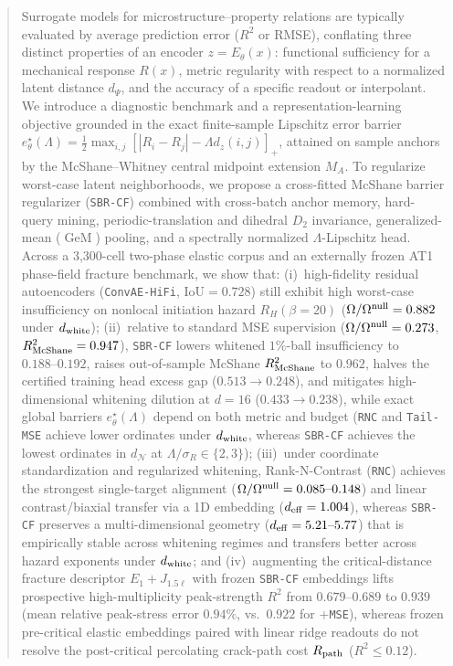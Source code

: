 \documentclass[preprint,11pt,a4paper]{elsarticle}
\newcommand{\GeM}{\operatorname{GeM}}
\begin{document}
\begin{frontmatter}
\begin{abstract}
Surrogate models for microstructure--property relations are typically evaluated by average prediction error ($R^2$ or RMSE), conflating three distinct properties of an encoder $z=E_\theta(x)$: functional sufficiency for a mechanical response $R(x)$, metric regularity with respect to a normalized latent distance $d_\Psi$, and the accuracy of a specific readout or interpolant. We introduce a diagnostic benchmark and a representation-learning objective grounded in the exact finite-sample Lipschitz error barrier $e^\star_\theta(\Lambda)=\frac12\max_{i,j}[|R_i-R_j|-\Lambda d_z(i,j)]_+$, attained on sample anchors by the McShane--Whitney central midpoint extension $M_A$. To regularize worst-case latent neighborhoods, we propose a cross-fitted McShane barrier regularizer (\texttt{SBR-CF}) combined with cross-batch anchor memory, hard-query mining, periodic-translation and dihedral $D_2$ invariance, generalized-mean ($\GeM$) pooling, and a spectrally normalized $\Lambda$-Lipschitz head. Across a 3,300-cell two-phase elastic corpus and an externally frozen AT1 phase-field fracture benchmark, we show that: (i)~high-fidelity residual autoencoders (\texttt{ConvAE-HiFi}, $\text{IoU}=0.728$) still exhibit high worst-case insufficiency on nonlocal initiation hazard $R_H(\beta=20)$ ($\Omega/\Omega^{\rm null}=0.882$ under $d_{\rm white}$); (ii)~relative to standard MSE supervision ($\Omega/\Omega^{\rm null}=0.273$, $R^2_{\rm McShane}=0.947$), \texttt{SBR-CF} lowers whitened $1\%$-ball insufficiency to $0.188\text{--}0.192$, raises out-of-sample McShane $R^2_{\rm McShane}$ to $0.962$, halves the certified training head excess gap ($0.513\to 0.248$), and mitigates high-dimensional whitening dilution at $d=16$ ($0.433\to 0.238$), while exact global barriers $e^\star_\theta(\Lambda)$ depend on both metric and budget (\texttt{RNC} and \texttt{Tail-MSE} achieve lower ordinates under $d_{\rm white}$, whereas \texttt{SBR-CF} achieves the lowest ordinates in $d_{\mathcal N}$ at $\Lambda/\sigma_R\in\{2,3\}$); (iii)~under coordinate standardization and regularized whitening, Rank-N-Contrast (\texttt{RNC}) achieves the strongest single-target alignment ($\Omega/\Omega^{\rm null}=0.085\text{--}0.148$) and linear contrast/biaxial transfer via a 1D embedding ($d_{\rm eff}=1.004$), whereas \texttt{SBR-CF} preserves a multi-dimensional geometry ($d_{\rm eff}=5.21\text{--}5.77$) that is empirically stable across whitening regimes and transfers better across hazard exponents under $d_{\rm white}$; and (iv)~augmenting the critical-distance fracture descriptor $E_1+J_{1.5\ell}$ with frozen \texttt{SBR-CF} embeddings lifts prospective high-multiplicity peak-strength $R^2$ from $0.679\text{--}0.689$ to $0.939$ (mean relative peak-stress error $0.94\%$, vs.\ $0.922$ for $+$\texttt{MSE}), whereas frozen pre-critical elastic embeddings paired with linear ridge readouts do not resolve the post-critical percolating crack-path cost $R_{\rm path}$ ($R^2\le 0.12$).
\end{abstract}


\end{frontmatter}
\end{document}

